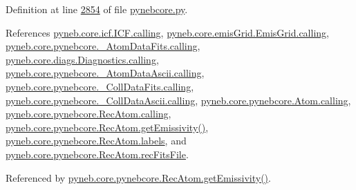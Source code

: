Definition at line \hyperlink{pynebcore_8py_source_l02854}{2854} of file \hyperlink{pynebcore_8py_source}{pynebcore.\+py}.



References \hyperlink{icf_8py_source_l00016}{pyneb.\+core.\+icf.\+I\+C\+F.\+calling}, \hyperlink{emis_grid_8py_source_l00041}{pyneb.\+core.\+emis\+Grid.\+Emis\+Grid.\+calling}, \hyperlink{pynebcore_8py_source_l00090}{pyneb.\+core.\+pynebcore.\+\_\+\+Atom\+Data\+Fits.\+calling}, \hyperlink{diags_8py_source_l00169}{pyneb.\+core.\+diags.\+Diagnostics.\+calling}, \hyperlink{pynebcore_8py_source_l00311}{pyneb.\+core.\+pynebcore.\+\_\+\+Atom\+Data\+Ascii.\+calling}, \hyperlink{pynebcore_8py_source_l00568}{pyneb.\+core.\+pynebcore.\+\_\+\+Coll\+Data\+Fits.\+calling}, \hyperlink{pynebcore_8py_source_l00918}{pyneb.\+core.\+pynebcore.\+\_\+\+Coll\+Data\+Ascii.\+calling}, \hyperlink{pynebcore_8py_source_l01175}{pyneb.\+core.\+pynebcore.\+Atom.\+calling}, \hyperlink{pynebcore_8py_source_l02572}{pyneb.\+core.\+pynebcore.\+Rec\+Atom.\+calling}, \hyperlink{pynebcore_8py_source_l02873}{pyneb.\+core.\+pynebcore.\+Rec\+Atom.\+get\+Emissivity()}, \hyperlink{pynebcore_8py_source_l02668}{pyneb.\+core.\+pynebcore.\+Rec\+Atom.\+labels}, and \hyperlink{pynebcore_8py_source_l02644}{pyneb.\+core.\+pynebcore.\+Rec\+Atom.\+rec\+Fits\+File}.



Referenced by \hyperlink{pynebcore_8py_source_l02873}{pyneb.\+core.\+pynebcore.\+Rec\+Atom.\+get\+Emissivity()}.


